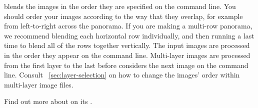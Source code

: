 \App{} blends the images in the order they are specified on the command line.  You should order
your images according to the way that they overlap, for example from left-to-right across the
panorama.  If you are making a multi-row panorama, we recommend blending each horizontal row
individually, and then running \App{} a last time to blend all of the rows together vertically.
The input images are processed in the order they appear on the command line.  Multi\hyp{}layer
images are processed from the first layer to the last before \App{} considers the next image on
the command line.  Consult \sectionName~\ref{sec:layer-selection} on how to change the images'
order within multi\hyp{}layer image files.

%
Find out more about \App{} on its 
.



